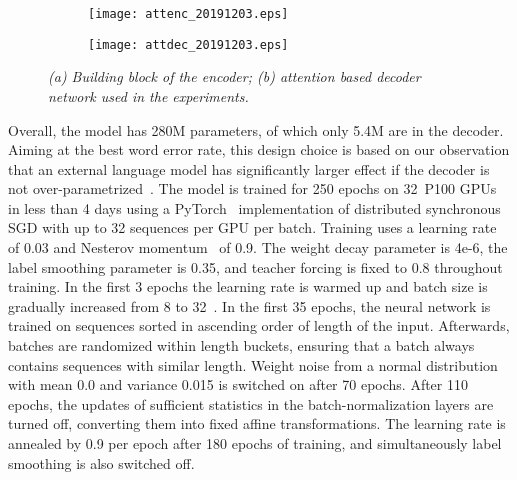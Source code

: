 \documentclass[a4paper]{article}
\begin{document}
\begin{figure}
\centering
\begin{subfigure}{0.31\linewidth}
\texttt{[image: attenc\_20191203.eps]}
\caption{} 
\label{fig:1a}
\end{subfigure}
\hspace{.1\linewidth}
\begin{subfigure}{0.5\linewidth}
\texttt{[image: attdec\_20191203.eps]}
\vspace{-7mm}
\caption{} 
\label{fig:1b}
\end{subfigure}
\vspace{-3mm}
\caption{{\label{fig:encdec}
{\it
(a) Building block of the encoder; (b) attention based decoder network used in the experiments.
}}}
\vspace{-6mm}
\end{figure}

Overall, the model has 280M parameters, of which only 5.4M are in the decoder.
Aiming at the best word error rate, this design choice is based on our observation that an external language model has significantly larger effect if the decoder is not over-parametrized~\cite{Tuske2019}.
The model is trained for 250 epochs on 32~P100 GPUs in less than 4 days using a PyTorch~\cite{pytorch} implementation of distributed synchronous SGD with up to 32 sequences per GPU per batch.
Training uses a learning rate of 0.03 and Nesterov momentum~\cite{nesterov1983} of 0.9.
The weight decay parameter is \mbox{4e-6}, the label smoothing parameter is 0.35, and teacher forcing is fixed to 0.8 throughout training.
In the first 3 epochs the learning rate is warmed up and batch size is gradually increased from 8 to 32~\cite{Goyal2017}.
In the first 35 epochs, the neural network is trained on sequences sorted in ascending order of length of the input.
Afterwards, batches are randomized within length buckets, ensuring that a batch always contains sequences with similar length.
Weight noise from a normal distribution with mean 0.0 and variance 0.015 is switched on after 70 epochs.
After 110 epochs, the updates of sufficient statistics in the batch-normalization layers are turned off, converting them into fixed affine transformations.
The learning rate is annealed by 0.9 per epoch after 180 epochs of training, and simultaneously label smoothing is also switched off.
\end{document}
